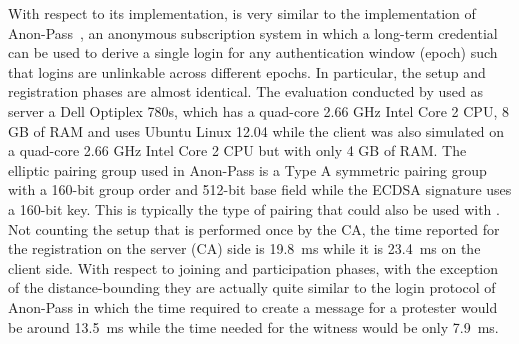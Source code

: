 With respect to its implementation, \CROCUS is very similar to the 
implementation of Anon-Pass~\cite{AnonPass}, an anonymous subscription system 
in which a long-term credential can be used to derive a single login for any 
authentication window (\ie epoch) such that logins are unlinkable across 
different epochs.
In particular, the setup and registration phases are almost identical.
The evaluation conducted by \textcite{AnonPass} used as server a Dell Optiplex 
780s, which has a quad-core 2.66 GHz Intel Core 2 CPU, 8 GB of RAM and uses 
Ubuntu Linux 12.04 while the client was also simulated on a quad-core 2.66 GHz 
Intel Core 2 CPU but with only 4 GB of RAM\@.
The elliptic pairing group used in Anon-Pass is a Type A symmetric pairing group with a 160-bit group order and 512-bit base field while the ECDSA signature uses a 160-bit key.
This is typically the type of pairing that could also be used with \CROCUS\@.
Not counting the setup that is performed once by the \ac{CA}, the time reported 
for the registration on the server (\ie \ac{CA}) side is 
\SI{19.8}{\milli\second} while it is \SI{23.4}{\milli\second} on the client 
side.
With respect to joining and participation phases, with the exception of the 
distance-bounding they are actually quite similar to the login protocol of 
Anon-Pass in which the time required to create a message for a protester would 
be around \SI{13.5}{\milli\second} while the time needed for the witness would 
be only \SI{7.9}{\milli\second}.

%


